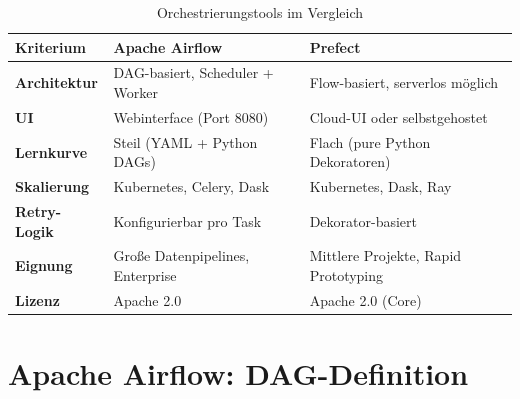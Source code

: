 ﻿\documentclass[12pt,a4paper]{report}
\theoremstyle{definition}
\theoremstyle{remark}
\begin{document}
\begin{table}[H]
\centering
\caption{Orchestrierungstools im Vergleich}
\label{tab:orch}
\renewcommand{\arraystretch}{1.3}
\begin{tabularx}{\linewidth}{>{\bfseries\footnotesize}l >{\footnotesize}X >{\footnotesize}X}
\toprule
Kriterium          & Apache Airflow                     & Prefect \\
\midrule
Architektur        & DAG-basiert, Scheduler + Worker    & Flow-basiert, serverlos m\"oglich \\
UI                 & Webinterface (Port 8080)           & Cloud-UI oder selbstgehostet \\
Lernkurve          & Steil (YAML + Python DAGs)         & Flach (pure Python Dekoratoren) \\
Skalierung         & Kubernetes, Celery, Dask           & Kubernetes, Dask, Ray \\
Retry-Logik        & Konfigurierbar pro Task            & Dekorator-basiert \\
Eignung            & Gro\ss{}e Datenpipelines, Enterprise & Mittlere Projekte, Rapid Prototyping \\
Lizenz             & Apache 2.0                         & Apache 2.0 (Core) \\
\bottomrule
\end{tabularx}
\end{table}

\section{Apache Airflow: DAG-Definition}
\end{document}
